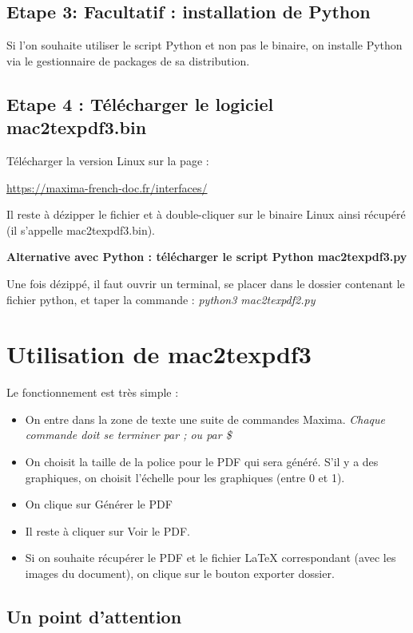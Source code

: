 \documentclass[a4paper, 11pt]{article}
\begin{document}
\subsection*{Etape 3: Facultatif : installation de Python}
Si l'on souhaite utiliser le script Python et non pas le binaire, on installe Python via le gestionnaire de packages de sa distribution.

\subsection*{Etape 4 : Télécharger le logiciel mac2texpdf3.bin}
Télécharger la version Linux sur la page :

\begin{center}
\href{https://maxima-french-doc.fr/interfaces/}{https://maxima-french-doc.fr/interfaces/}
\end{center}
Il reste à dézipper le fichier et à double-cliquer sur le binaire Linux ainsi récupéré (il s'appelle mac2texpdf3.bin).

\textbf{Alternative avec Python : télécharger le script Python mac2texpdf3.py}

Une fois dézippé, il faut ouvrir un terminal, se placer dans le dossier contenant le fichier python, et taper la commande :
\textit{python3 mac2texpdf2.py}


\section*{Utilisation de mac2texpdf3}

Le fonctionnement est très simple :
\begin{itemize}
\item On entre dans la zone de texte une suite de commandes Maxima. \emph{Chaque commande doit se terminer par ; ou par \$}
\item On choisit la taille de la police pour le PDF qui sera généré. S'il y a des graphiques, on choisit l'échelle pour les graphiques (entre 0 et 1).
\item On clique sur Générer le PDF
\item Il reste à cliquer sur Voir le PDF. 
\item Si on souhaite récupérer le PDF et le fichier \LaTeX{} correspondant (avec les images du document), on clique sur le bouton exporter dossier.
\end{itemize}

\subsection*{Un point d'attention}
\end{document}
